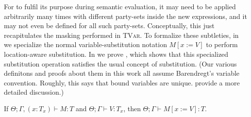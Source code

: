 For \mask to fulfil its purpose during semantic evaluation,
it may need to be applied arbitrarily many times with different party-sets
inside the new expressions, and it may not even be defined for all such
party-sets.
Conceptually, this just recapitulates the masking performed in \textsc{TVar}.
To formalize these subtleties, in  we specialize the normal variable-substitution
notation $M[x:=V]$ to perform location-aware substitution.
In  we prove ,
which shows that this specialized substitution operation
satisfies the usual concept of substitution.
(Our various definitons and proofs about them in this work all assume Barendregt’s variable convention.
Roughly, this says that bound variables are unique.
\cite{barendregtDiscussion} provide a more detailed discussion.)
\begin{theorem}[Substitution]\label{theorem:substitution}
  If $Θ;Γ,(x:T_x) ⊢ M : T$ and $Θ;Γ ⊢ V : T_x$,
  then $Θ;Γ ⊢ M[x := V] : T$.
\end{theorem}

